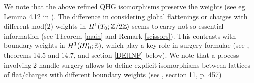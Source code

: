 We note that the above refined QHG isomorphisms preserve the weights
(see eg. Lemma 4.12 in \cite{BB1}). The difference in considering
global flattenings or charges with different mod($2$) weights in
$H^1(T_0;\mathbb{Z}/2\mathbb{Z})$ seems to carry not so essential information (see
Theorem \ref{main} and Remark \ref{scissors}). This contrasts with
boundary weights in $H^1(\partial T_0;\mathbb{Z})$, which play a key role in
surgery formulae (see \cite{N}, theorems 14.5 and 14.7, and section
\ref{DEHNF} below). We note that a process involving $2$-handle
surgery allows to define explicit isomorphisms between lattices of
flat/charges with different boundary weights (see \cite{N}, section
11, p. 457).
